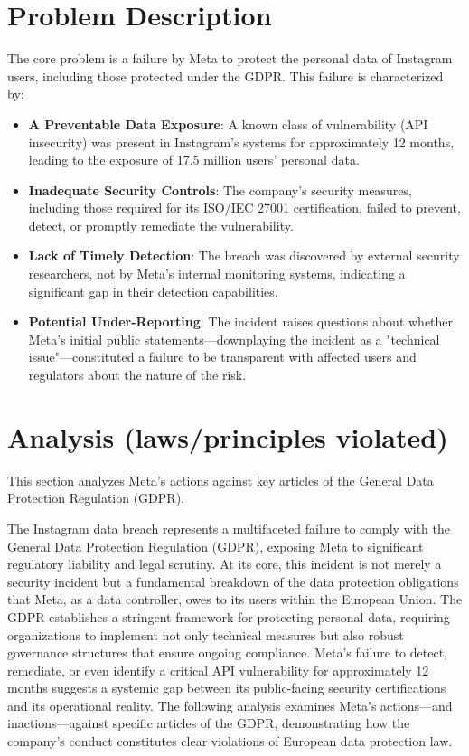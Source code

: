 \documentclass{article}
\begin{document}
\section{Problem Description}
The core problem is a failure by Meta to protect the personal data of Instagram users, including those protected under the GDPR. This failure is characterized by:
\begin{itemize}
\item \textbf{ A Preventable Data Exposure}: A known class of vulnerability (API insecurity) was present in Instagram's systems for approximately 12 months, leading to the exposure of 17.5 million users' personal data.

\item \textbf{Inadequate Security Controls}: The company's security measures, including those required for its ISO/IEC 27001 certification, failed to prevent, detect, or promptly remediate the vulnerability.

\item \textbf{Lack of Timely Detection}: The breach was discovered by external security researchers, not by Meta's internal monitoring systems, indicating a significant gap in their detection capabilities.

\item \textbf{Potential Under-Reporting}: The incident raises questions about whether Meta's initial public statements—downplaying the incident as a "technical issue"—constituted a failure to be transparent with affected users and regulators about the nature of the risk.
\end{itemize}
\section{Analysis (laws/principles violated)}
This section analyzes Meta's actions against key articles of the General Data Protection Regulation (GDPR).

The Instagram data breach represents a multifaceted failure to comply with the General Data Protection Regulation (GDPR), exposing Meta to significant regulatory liability and legal scrutiny. At its core, this incident is not merely a security incident but a fundamental breakdown of the data protection obligations that Meta, as a data controller, owes to its users within the European Union. The GDPR establishes a stringent framework for protecting personal data, requiring organizations to implement not only technical measures but also robust governance structures that ensure ongoing compliance. Meta's failure to detect, remediate, or even identify a critical API vulnerability for approximately 12 months suggests a systemic gap between its public-facing security certifications and its operational reality. The following analysis examines Meta's actions—and inactions—against specific articles of the GDPR, demonstrating how the company's conduct constitutes clear violations of European data protection law.
\end{document}
